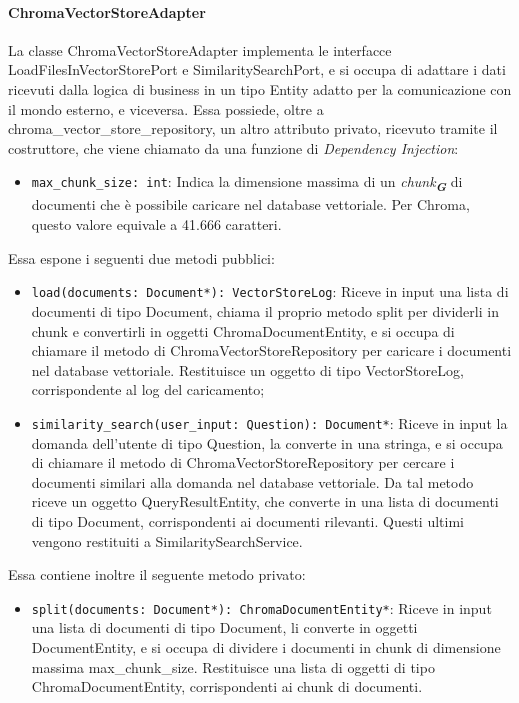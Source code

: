 \paragraph{ChromaVectorStoreAdapter}
\label{sec:chroma_vector_store_adapter}
La classe ChromaVectorStoreAdapter implementa le interfacce LoadFilesInVectorStorePort e SimilaritySearchPort, e si occupa di adattare i dati ricevuti dalla logica di business in un tipo Entity adatto per la comunicazione con il mondo esterno, e viceversa. 
Essa possiede, oltre a chroma\_vector\_store\_repository, un altro attributo privato, ricevuto tramite il costruttore, che viene chiamato da una funzione di \emph{Dependency Injection}:
\begin{itemize}
    \item \texttt{max\_chunk\_size: int}: Indica la dimensione massima di un \emph{chunk}\textsubscript{\textbf{\textit{G}}} di documenti che è possibile caricare nel database vettoriale. Per Chroma, questo valore equivale a 41.666 caratteri.
\end{itemize}
Essa espone i seguenti due metodi pubblici:
\begin{itemize}
    \item \texttt{load(documents: Document*): VectorStoreLog}: Riceve in input una lista di documenti di tipo Document, chiama il proprio metodo split per dividerli in chunk e convertirli in oggetti ChromaDocumentEntity, e si occupa di chiamare il metodo di ChromaVectorStoreRepository per caricare i documenti nel database vettoriale. Restituisce un oggetto di tipo VectorStoreLog, corrispondente al log del caricamento;
    \item \texttt{similarity\_search(user\_input: Question): Document*}: Riceve in input la domanda dell'utente di tipo Question, la converte in una stringa, e si occupa di chiamare il metodo di ChromaVectorStoreRepository per cercare i documenti similari alla domanda nel database vettoriale. Da tal metodo riceve un oggetto QueryResultEntity, che converte in una lista di documenti di tipo Document, corrispondenti ai documenti rilevanti. Questi ultimi vengono restituiti a SimilaritySearchService.
\end{itemize}
Essa contiene inoltre il seguente metodo privato:
\begin{itemize}
    \item \texttt{split(documents: Document*): ChromaDocumentEntity*}: Riceve in input una lista di documenti di tipo Document, li converte in oggetti DocumentEntity, e si occupa di dividere i documenti in chunk di dimensione massima max\_chunk\_size. Restituisce una lista di oggetti di tipo ChromaDocumentEntity, corrispondenti ai chunk di documenti.
\end{itemize}

